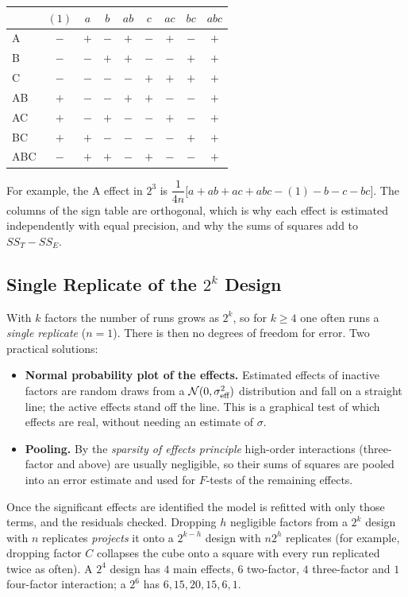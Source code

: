 \begin{center}
\begin{tabular}{l|cccccccc}
\toprule
 & $(1)$ & $a$ & $b$ & $ab$ & $c$ & $ac$ & $bc$ & $abc$\\
\midrule
A & $-$ & $+$ & $-$ & $+$ & $-$ & $+$ & $-$ & $+$\\
B & $-$ & $-$ & $+$ & $+$ & $-$ & $-$ & $+$ & $+$\\
C & $-$ & $-$ & $-$ & $-$ & $+$ & $+$ & $+$ & $+$\\
AB & $+$ & $-$ & $-$ & $+$ & $+$ & $-$ & $-$ & $+$\\
AC & $+$ & $-$ & $+$ & $-$ & $-$ & $+$ & $-$ & $+$\\
BC & $+$ & $+$ & $-$ & $-$ & $-$ & $-$ & $+$ & $+$\\
ABC & $-$ & $+$ & $+$ & $-$ & $+$ & $-$ & $-$ & $+$\\
\bottomrule
\end{tabular}
\end{center}

For example, the A effect in $2^3$ is $\dfrac1{4n}\big[a+ab+ac+abc-(1)-b-c-bc\big]$. The columns of the sign table are orthogonal, which is why each effect is estimated independently with equal precision, and why the sums of squares add to $SS_T-SS_E$.

\subsection{Single Replicate of the $2^k$ Design}

With $k$ factors the number of runs grows as $2^k$, so for $k\ge4$ one often runs a \emph{single replicate} ($n=1$). There is then no degrees of freedom for error. Two practical solutions:
\begin{itemize}
  \item \textbf{Normal probability plot of the effects.} Estimated effects of inactive factors are random draws from a $\mathcal{N}(0,\sigma_{\text{eff}}^2)$ distribution and fall on a straight line; the active effects stand off the line. This is a graphical test of which effects are real, without needing an estimate of $\sigma$.
  \item \textbf{Pooling.} By the \emph{sparsity of effects principle} high-order interactions (three-factor and above) are usually negligible, so their sums of squares are pooled into an error estimate and used for $F$-tests of the remaining effects.
\end{itemize}
Once the significant effects are identified the model is refitted with only those terms, and the residuals checked. Dropping $h$ negligible factors from a $2^k$ design with $n$ replicates \emph{projects} it onto a $2^{k-h}$ design with $n2^h$ replicates (for example, dropping factor $C$ collapses the cube onto a square with every run replicated twice as often). A $2^4$ design has $4$ main effects, $6$ two-factor, $4$ three-factor and $1$ four-factor interaction; a $2^6$ has $6, 15, 20, 15, 6, 1$.

